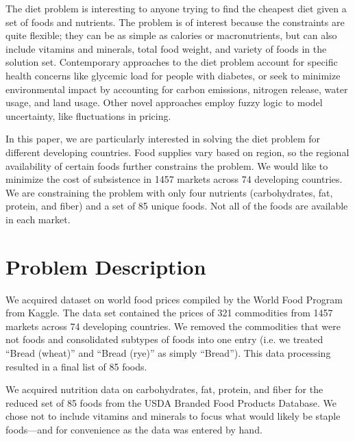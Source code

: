 The diet problem is interesting to anyone trying to find the cheapest diet given
a set of foods and nutrients. The problem is of interest because the constraints
are quite flexible; they can be as simple as calories or macronutrients, but can
also include vitamins and minerals, total food weight, and variety of foods in
the solution set. Contemporary approaches to the diet problem account for
specific health concerns like glycemic load for people with diabetes,\cite{Bas}
or seek to minimize environmental impact by accounting for carbon emissions,
nitrogen release, water usage, and land usage.\cite{Gephart} Other novel
approaches employ fuzzy logic to model uncertainty, like fluctuations in
pricing.\cite{Bas}

In this paper, we are particularly interested in solving the diet problem for different developing countries. Food supplies vary based on region, so the regional availability of certain foods further constrains the problem. We would like to minimize the cost of subsistence in 1457 markets across 74 developing countries. We are constraining the problem with only four nutrients (carbohydrates, fat, protein, and fiber) and a set of 85 unique foods. Not all of the foods are available in each market.

\begin{comment}
\begin{figure}[H]
	\begin{center}
	  \texttt{[image: NMRspec.png]}
	  \caption{A schematic of an FT--NMR spectrometer.\cite{Klein}}
	  \label{fgr:nmr}
	\end{center}
\end{figure}
\end{comment}

\section{Problem Description}
We acquired dataset on world food prices compiled by the World Food Program from
Kaggle.\cite{Kaggle} The data set contained the prices of 321 commodities from
1457 markets across 74 developing countries. We removed the commodities that
were not foods and consolidated subtypes of foods into one entry (i.e. we
treated ``Bread (wheat)'' and ``Bread (rye)'' as simply ``Bread''). This data processing resulted in a final list of 85 foods.

We acquired nutrition data on carbohydrates, fat, protein, and fiber for the
reduced set of 85 foods from the USDA Branded Food Products Database.\cite{USDA} We chose
not to include vitamins and minerals to focus what would likely be staple
foods---and for convenience as the data was entered by hand.

